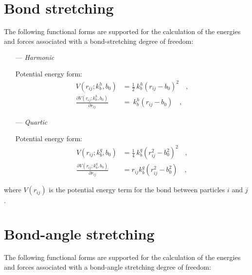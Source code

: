 \documentclass[10pt,a4paper,openany]{memoir}
\numberwithin{equation}{section}
\begin{document}
\section{Bond stretching}
\label{sec:bond-terms}

The following functional forms are supported for the calculation of
the energies and forces associated with a bond-stretching degree of freedom:\cite{GROMOS-doc,GROMACS-doc}

\begin{itemize}
\item [---] \textit{Harmonic}
  \par
  Potential energy form:
  \begin{align}
    \label{eq:harmonic-bond-energy}
    V(r_{ij}; k_b^h, b_0) & = \frac{1}{2} \ k_b^h (r_{ij} - b_0)^2 \quad , \\ \nonumber
    \frac{\partial V(r_{ij}; k_b^h, b_0)}{\partial r_{ij}} & = \ k_b^h (r_{ij} - b_0) \quad ,
  \end{align}
  
\item [---] \textit{Quartic}
  \par
  Potential energy form:
  \begin{align}
    \label{eq:quartic-bond-energy}
    V(r_{ij}; k_b^q, b_0) & = \frac{1}{4} \ k_b^q (r_{ij}^2 - b_0^2)^2 \quad , \\ \nonumber
    \frac{\partial V(r_{ij}; k_b^q, b_0)}{\partial r_{ij}} & = r_{ij} k_b^q (r_{ij}^2 - b_0^2) \quad ,
  \end{align}

\end{itemize}

\noindent
where $V(r_{ij})$ is the potential energy term for the bond between particles $i$ and $j$.

\section{Bond-angle stretching}
\label{sec:angle-terms}

The following functional forms are supported for the calculation of
the energies and forces associated with a bond-angle stretching degree of freedom:\cite{GROMOS-doc,GROMACS-doc}
\end{document}

